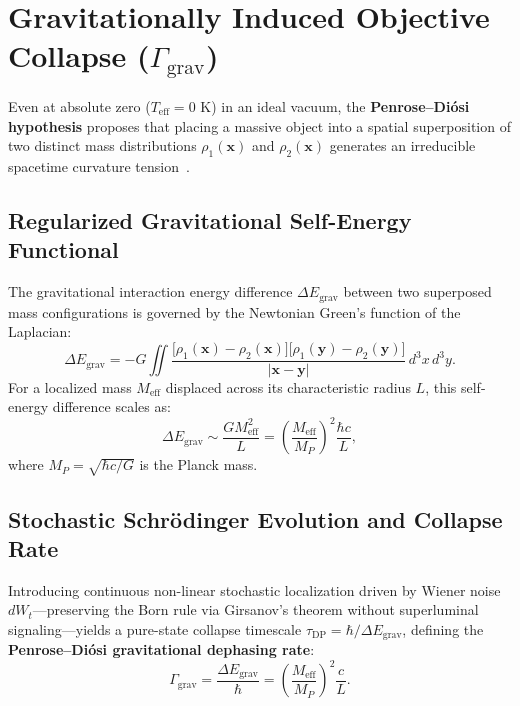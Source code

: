 \documentclass[11pt,a4paper]{article}
\begin{document}
\section{Gravitationally Induced Objective Collapse (\texorpdfstring{$\Gamma_{\mathrm{grav}}$}{Gamma\_grav})}

Even at absolute zero ($T_{\mathrm{eff}} = 0\text{ K}$) in an ideal vacuum, the \textbf{Penrose--Di\'osi hypothesis} proposes that placing a massive object into a spatial superposition of two distinct mass distributions $\rho_1(\mathbf{x})$ and $\rho_2(\mathbf{x})$ generates an irreducible spacetime curvature tension~\cite{Diosi1989,Penrose1996}.

\subsection{Regularized Gravitational Self-Energy Functional}
The gravitational interaction energy difference $\Delta E_{\mathrm{grav}}$ between two superposed mass configurations is governed by the Newtonian Green's function of the Laplacian:
\begin{equation}
\Delta E_{\mathrm{grav}} = -G \iint \frac{\big[\rho_1(\mathbf{x}) - \rho_2(\mathbf{x})\big]\big[\rho_1(\mathbf{y}) - \rho_2(\mathbf{y})\big]}{|\mathbf{x} - \mathbf{y}|}\, d^3x\, d^3y.
\end{equation}
For a localized mass $M_{\mathrm{eff}}$ displaced across its characteristic radius $L$, this self-energy difference scales as:
\begin{equation}
\Delta E_{\mathrm{grav}} \sim \frac{G M_{\mathrm{eff}}^2}{L} = \left(\frac{M_{\mathrm{eff}}}{M_P}\right)^2 \frac{\hbar c}{L},
\end{equation}
where $M_P = \sqrt{\hbar c / G}$ is the Planck mass.

\subsection{Stochastic Schr\"odinger Evolution and Collapse Rate}
Introducing continuous non-linear stochastic localization driven by Wiener noise $dW_t$---preserving the Born rule via Girsanov's theorem without superluminal signaling---yields a pure-state collapse timescale $\tau_{\mathrm{DP}} = \hbar / \Delta E_{\mathrm{grav}}$, defining the \textbf{Penrose--Di\'osi gravitational dephasing rate}:
\begin{equation}
\Gamma_{\mathrm{grav}} = \frac{\Delta E_{\mathrm{grav}}}{\hbar} = \left(\frac{M_{\mathrm{eff}}}{M_P}\right)^2 \frac{c}{L}.
\end{equation}
\end{document}
